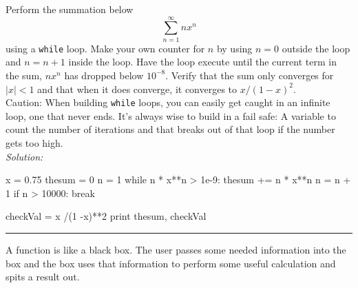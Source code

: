 \begin{enumerate}

    \probtwo Perform the summation below
    \[
        \sum_{n=1}^{\infty} n x^n
    \]
    using a {\tt while} loop.  Make your own counter for $n$ by using $n=0$
    outside the loop and $n=n+1$ inside the loop. Have the loop
    execute until the current term in the sum, $n x^n$ has dropped
    below $10^{-8}$. Verify that the sum only converges for $|x| < 1$
    and that when it does converge, it converges to
    $x/(1-x)^2$.\\
 Caution:  When building \texttt{while} loops, you can
    easily get caught in an infinite loop, one that never ends.  It's
    always wise to build in a fail safe: A variable to count the
    number of iterations and that breaks out of that loop if the
    number gets too high.\\
\ifsolutions
\textit{Solution:}\\
\begin{codeexample}
\begin{VerbatimOut}{\listingFile}
x = 0.75
thesum = 0
n = 1
while n * x**n > 1e-9:
    thesum += n * x**n 
    n = n + 1
    if n > 10000:
        break

checkVal = x /(1 -x)**2
print thesum, checkVal
\end{VerbatimOut}
\end{codeexample}
\else
\noindent\rule{5 in}{0.01 in}
\fi
\end{enumerate}



 A function is like a black box.  The user
passes some needed information into the box and the box uses that
information to perform some useful calculation and spits a result
out.  

